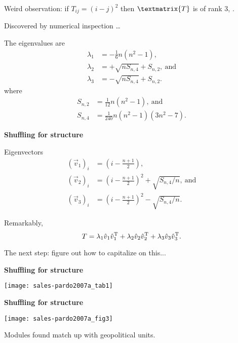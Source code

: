     Weird observation: if $T_{ij} = (i-j)^2$
    then $\textmatrix{T}$ is of \alert{rank 3}, .
  
    Discovered by numerical inspection \ldots
  
    The eigenvalues are 
    \begin{align}
      \lambda_1 & = -\frac{1}{6}n(n^2-1), \nonumber \\
      \lambda_2 & = +\sqrt{n S_{n,4}} + S_{n,2}, \ \mbox{and} \nonumber \\
      \lambda_3 & = -\sqrt{n S_{n,4}} + S_{n,2}. \nonumber
    \end{align}
    where
    \begin{align}
      S_{n,2} &= \frac{1}{12} n (n^2-1), \ \mbox{and} \nonumber \\
      S_{n,4} & = \frac{1}{240}n(n^2-1)(3n^2 - 7).
      \nonumber
    \end{align}

  


  \textbf{Shuffling for structure}

  
  
    Eigenvectors
    \begin{align}
      \left(\vec{v}_1\right)_i & = \left( i - \frac{n+1}{2} \right), \nonumber \\
      \left(\vec{v}_2\right)_i & = \left( i - \frac{n+1}{2} \right)^2  + \sqrt{S_{n,4}/n},
      \ \mbox{and} \nonumber \\
      \left(\vec{v}_3\right)_i & = \left( i - \frac{n+1}{2} \right)^2  - \sqrt{S_{n,4}/n}.
      \nonumber
    \end{align}
  
    Remarkably,
    $$
    T = 
    \lambda_1 \hat{v}_1 \hat{v}_1^{\textnormal{T}}
    +
    \lambda_2 \hat{v}_2 \hat{v}_2^{\textnormal{T}}
    +
    \lambda_3 \hat{v}_3 \hat{v}_3^{\textnormal{T}}.
    $$
  
    \alert{The next step:} figure out how to capitalize on this...
  



  \textbf{Shuffling for structure}

  \texttt{[image: sales-pardo2007a\_tab1]}


  \textbf{Shuffling for structure}

  \texttt{[image: sales-pardo2007a\_fig3]}

  
   
    Modules found match up with geopolitical units.
  



